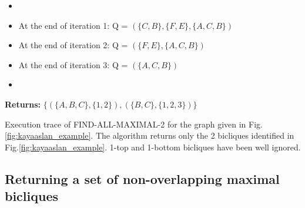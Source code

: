 \documentclass[table]{report}
\begin{document}
\begin{table}[h]
\begin{framed}
\begin{flushleft}
\begin{itemize} [noitemsep]
\item
 
\item At the end of iteration 1:
 \hspace{0.1em}Q = $(\{C,B\},\{F,E\},\{A,C,B\})$\\
\item At the end of iteration 2:
 \hspace{0.1em}Q = $(\{F,E\},\{A,C,B\})$\\
\item At the end of iteration 3:
 \hspace{0.1em}Q = $(\{A,C,B\})$\\
 
 \item
\end{itemize}

\textbf{Returns:} 
$\{ (\{A,B,C\}, \{1,2\}), (\{B,C\}, \{1,2,3\}) \}$
\end{flushleft}
\end{framed}
\caption{Execution trace of FIND-ALL-MAXIMAL-2 for the graph given in Fig.\ref{fig:kayaaslan_example}. The algorithm returns only the 2 bicliques identified in Fig.\ref{fig:kayaaslan_example}. 1-top and 1-bottom bicliques have been well ignored.}
\end{table}
\FloatBarrier



\subsection{Returning a set of non-overlapping maximal bicliques}
\end{document}
